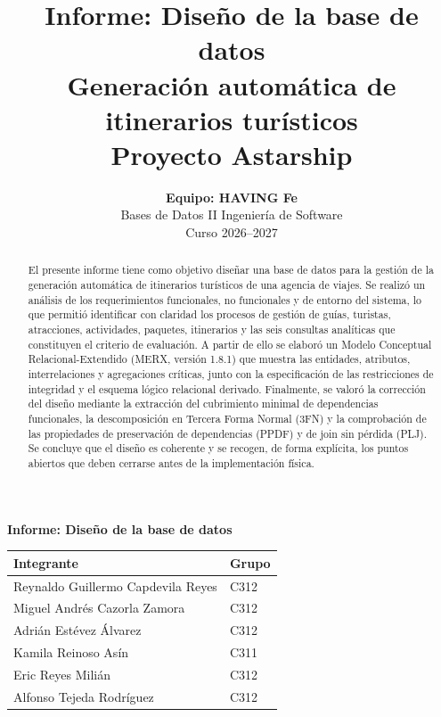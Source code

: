 \documentclass[11pt,a4paper]{article}
\title{\textbf{Informe: Diseño de la base de datos}\\[1ex]\large Generación automática de itinerarios turísticos\\Proyecto Astarship}
\author{\textbf{Equipo: HAVING Fe}\\Bases de Datos II \textperiodcentered{} Ingeniería de Software\\Curso 2026--2027}
\begin{document}
\begin{titlepage}
\centering\vspace*{3cm}
{\Huge\bfseries Informe: Diseño de la base de datos\par}
\vspace{1cm}{\Large Generación automática de itinerarios turísticos\par}
\vspace{.4cm}{\Large Proyecto Astarship\par}
\vspace{1.5cm}{\large\bfseries Equipo: HAVING Fe\par}
\vspace{0.9cm}
\begin{tabular}{p{8.2cm}>{\centering\arraybackslash}p{1.8cm}}
\hline
\textbf{Integrante} & \textbf{Grupo} \\
\hline
Reynaldo Guillermo Capdevila Reyes & C312 \\
Miguel Andrés Cazorla Zamora & C312 \\
Adrián Estévez Álvarez & C312 \\
Kamila Reinoso Asín & C311 \\
Eric Reyes Milián & C312 \\
Alfonso Tejeda Rodríguez & C312 \\
\hline
\end{tabular}\par
{}
\end{titlepage}
\pagestyle{plain}
\begin{abstract}
El presente informe tiene como objetivo diseñar una base de datos para la gestión de la generación automática de itinerarios turísticos de una agencia de viajes. Se realizó un análisis de los requerimientos funcionales, no funcionales y de entorno del sistema, lo que permitió identificar con claridad los procesos de gestión de guías, turistas, atracciones, actividades, paquetes, itinerarios y las seis consultas analíticas que constituyen el criterio de evaluación. A partir de ello se elaboró un Modelo Conceptual Relacional-Extendido (MERX, versión 1.8.1) que muestra las entidades, atributos, interrelaciones y agregaciones críticas, junto con la especificación de las restricciones de integridad y el esquema lógico relacional derivado. Finalmente, se valoró la corrección del diseño mediante la extracción del cubrimiento minimal de dependencias funcionales, la descomposición en Tercera Forma Normal (3FN) y la comprobación de las propiedades de preservación de dependencias (PPDF) y de join sin pérdida (PLJ). Se concluye que el diseño es coherente y se recogen, de forma explícita, los puntos abiertos que deben cerrarse antes de la implementación física.
\end{abstract}
\newpage
\tableofcontents
\newpage
\listoftables
\listoffigures
\newpage
\end{document}
